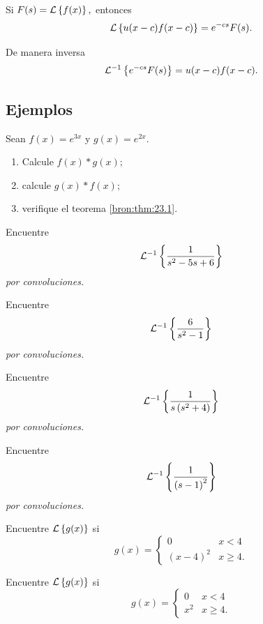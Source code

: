 	\begin{thm}
		\label{bron:thm:23.4}
		Si $F(s)=\mathcal{L}\left\{ f(x) \right\},$ entonces
		$$
		\mathcal{L}\left\{ u(x-c)f(x-c) \right\}=e^{-cs}F(s).
		$$
		
		De manera inversa
		$$\mathcal{L}^{-1}\left\{ e^{-cs}F(s) \right\}=u(x-c)f(x-c).$$
	\end{thm}
	


\subsection{Ejemplos}


	\begin{problema}
		\label{bron:exmp:23.1} Sean $f(x)=e^{3x}$ y $g(x)=e^{2x}.$
		\begin{enumerate}
			\item Calcule $f(x) \ast g(x);$
			\item calcule $g(x) \ast f(x);$
			\item verifique el teorema \ref{bron:thm:23.1}.
		\end{enumerate}
		
	\end{problema}
	



	\begin{problema}
		\label{bron:exmp:23.4}
		Encuentre
		$$
		\mathcal{L}^{-1}\left\{ \dfrac{1}{s^{2}-5s+6} \right\}
		$$
		\emph{por convoluciones.}
	\end{problema}
	



	\begin{problema}
		\label{bron:exmp:23.5}
		Encuentre
		$$
		\mathcal{L}^{-1}\left\{ \dfrac{6}{s^{2}-1} \right\}
		$$
		\emph{por convoluciones.}
	\end{problema}
	



	\begin{problema}
		\label{bron:exmp:23.6}
		Encuentre
		$$
		\mathcal{L}^{-1}\left\{ \dfrac{1}{s\left( s^{2}+4 \right)} \right\}
		$$
		\emph{por convoluciones.}
	\end{problema}
	



	\begin{problema}
		\label{bron:exmp:23.7}
		Encuentre
		$$
		\mathcal{L}^{-1}\left\{ \dfrac{1}{\left( s-1 \right)^{2}} \right\}
		$$
		\emph{por convoluciones.}
	\end{problema}
	



	\begin{problema}
		\label{bron:exmp:23.13}
		Encuentre $\mathcal{L}\left\{ g(x) \right\}$ si
		$$
		g(x)=\begin{cases}
		0 & x<4\\
		\left( x-4 \right)^{2} & x\geq 4.
		\end{cases}
		$$
	\end{problema}
	



	\begin{problema}
		\label{bron:exmp:23.14}
		Encuentre $\mathcal{L}\left\{ g(x) \right\}$ si
		$$
		g(x)=\begin{cases}
		0 & x<4\\
		x^{2} & x\geq 4.
		\end{cases}
		$$
	\end{problema}
	


